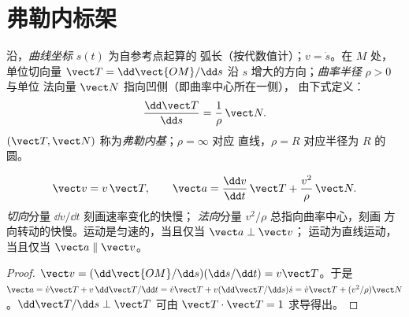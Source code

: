 \section{弗勒内标架}

\begin{definition}\label{def:b1:point-kinematics:frenet}
沿，\emph{曲线坐标} $s(t)$ 为自参考点起算的
弧长（按代数值计）；$v = \dot s$。在
$M$ 处，单位切向量 $\vect T = \dd\vect{OM}/\dd s$ 沿
$s$ 增大的方向；\emph{曲率半径} $\rho > 0$ 与单位
法向量 $\vect N$ 指向凹侧（即曲率中心所在一侧），
由下式定义：
\[
\frac{\dd\vect T}{\dd s} = \frac{1}{\rho}\,\vect N .
\]
$(\vect T, \vect N)$ 称为\emph{弗勒内基}；$\rho = \infty$ 对应
直线，$\rho = R$ 对应半径为 $R$ 的圆。
\end{definition}

\begin{theorem}[弗勒内基下的加速度]\label{thm:b1:point-kinematics:frenet}
\[
\vect v = v\,\vect T, \qquad
\vect a = \frac{\dd v}{\dd t}\,\vect T + \frac{v^2}{\rho}\,\vect N .
\]
\emph{切向}分量 $\dd v/\dd t$ 刻画速率变化的快慢；
\emph{法向}分量 $v^2/\rho$ 总指向曲率中心，刻画
方向转动的快慢。运动是匀速的，当且仅当 $\vect a \perp \vect v$；
运动为直线运动，当且仅当
$\vect a \parallel \vect v$。
\end{theorem}

\begin{proof}
$\vect v = (\dd\vect{OM}/\dd s)(\dd s/\dd t) = v\vect T$。于是 $\vect a =
\dot v\vect T + v\,\dd\vect T/\dd t = \dot v\vect T + v(\dd\vect T/\dd s)\dot s
= \dot v\vect T + (v^2/\rho)\vect N$。$\dd\vect T/\dd s \perp \vect T$
可由 $\vect T\cdot\vect T = 1$ 求导得出。
\end{proof}

